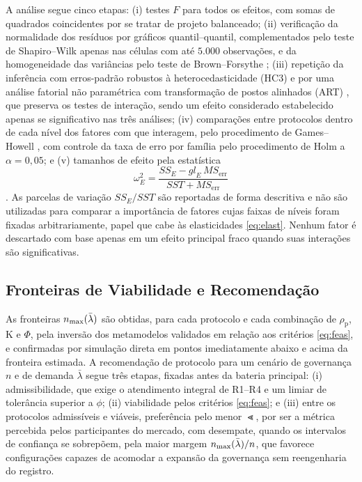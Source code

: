 A análise segue cinco etapas: (i) testes $F$ para todos os efeitos, com somas de quadrados coincidentes por se tratar de projeto balanceado; (ii) verificação da normalidade dos resíduos por gráficos quantil--quantil, complementados pelo teste de Shapiro--Wilk \citep{Shapiro1965} apenas nas células com até $5.000$ observações, e da homogeneidade das variâncias pelo teste de Brown--Forsythe \citep{Brown1974}; (iii) repetição da inferência com erros-padrão robustos à heterocedasticidade (HC3) \citep{Long2000} e por uma análise fatorial não paramétrica com transformação de postos alinhados (ART) \citep{Wobbrock2011}, que preserva os testes de interação, sendo um efeito considerado estabelecido apenas se significativo nas três análises; (iv) comparações entre protocolos dentro de cada nível dos fatores com que interagem, pelo procedimento de Games--Howell \citep{Games1976}, com controle da taxa de erro por família pelo procedimento de Holm \citep{Holm1979} a $\alpha = 0{,}05$; e (v) tamanhos de efeito pela estatística
\begin{equation}
\omega^{2}_{E} = \frac{SS_{E} - \mathit{gl}_{E}\, MS_{\mathrm{err}}}{SST + MS_{\mathrm{err}}}
\label{eq:omega}
\end{equation}
\citep{Olejnik2003}. As parcelas de variação $SS_{E}/SST$ \citep{Jain1991} são reportadas de forma descritiva e não são utilizadas para comparar a importância de fatores cujas faixas de níveis foram fixadas arbitrariamente, papel que cabe às elasticidades \eqref{eq:elast}. Nenhum fator é descartado com base apenas em um efeito principal fraco quando suas interações são significativas.

\subsection{Fronteiras de Viabilidade e Recomendação}

As fronteiras $n_{\max}(\bar{\lambda})$ são obtidas, para cada protocolo e cada combinação de $\rho_{\mathrm{p}}$, K e $\Phi$, pela inversão dos metamodelos validados em relação aos critérios \eqref{eq:feas}, e confirmadas por simulação direta em pontos imediatamente abaixo e acima da fronteira estimada. A recomendação de protocolo para um cenário de governança $n$ e de demanda $\bar{\lambda}$ segue três etapas, fixadas antes da bateria principal: (i) admissibilidade, que exige o atendimento integral de R1--R4 e um limiar de tolerância superior a $\phi$; (ii) viabilidade pelos critérios \eqref{eq:feas}; e (iii) entre os protocolos admissíveis e viáveis, preferência pelo menor $\Lt$, por ser a métrica percebida pelos participantes do mercado, com desempate, quando os intervalos de confiança se sobrepõem, pela maior margem $n_{\max}(\bar{\lambda})/n$, que favorece configurações capazes de acomodar a expansão da governança sem reengenharia do registro.
